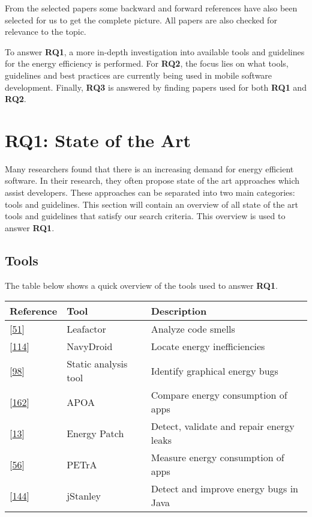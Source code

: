 \documentclass[]{book}
\begin{document}
From the selected papers some backward and forward references have also
been selected for us to get the complete picture. All papers are also
checked for relevance to the topic.

To answer \textbf{RQ1}, a more in-depth investigation into available
tools and guidelines for the energy efficiency is performed. For
\textbf{RQ2}, the focus lies on what tools, guidelines and best
practices are currently being used in mobile software development.
Finally, \textbf{RQ3} is answered by finding papers used for both
\textbf{RQ1} and \textbf{RQ2}.

\section{RQ1: State of the Art}\label{rq1-state-of-the-art}

Many researchers found that there is an increasing demand for energy
efficient software. In their research, they often propose state of the
art approaches which assist developers. These approaches can be
separated into two main categories: tools and guidelines. This section
will contain an overview of all state of the art tools and guidelines
that satisfy our search criteria. This overview is used to answer
\textbf{RQ1}.

\subsection{Tools}\label{tools}

The table below shows a quick overview of the tools used to answer
\textbf{RQ1}.

\begin{longtable}[]{@{}lll@{}}
\toprule
Reference & Tool & Description\tabularnewline
\midrule
\endhead
{[}\protect\hyperlink{ref-CA2018}{51}{]} & Leafactor & Analyze code
smells\tabularnewline
{[}\protect\hyperlink{ref-LWXM2017}{114}{]} & NavyDroid & Locate energy
inefficiencies\tabularnewline
{[}\protect\hyperlink{ref-KKK2016}{98}{]} & Static analysis tool &
Identify graphical energy bugs\tabularnewline
{[}\protect\hyperlink{ref-SKHA2018}{162}{]} & APOA & Compare energy
consumption of apps\tabularnewline
{[}\protect\hyperlink{ref-BCBR2017}{13}{]} & Energy Patch & Detect,
validate and repair energy leaks\tabularnewline
{[}\protect\hyperlink{ref-NPPPZL2017B}{56}{]} & PETrA & Measure energy
consumption of apps\tabularnewline
{[}\protect\hyperlink{ref-PSCS2018}{144}{]} & jStanley & Detect and
improve energy bugs in Java\tabularnewline
\bottomrule
\end{longtable}
\end{document}
